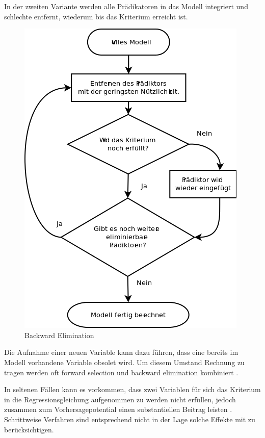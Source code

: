 \documentclass[english,12pt,doc]{apa}
\begin{document}
In der zweiten Variante werden alle Prädikatoren in das Modell integriert und schlechte entfernt, wiederum bis das Kriterium erreicht ist. 
\begin{figure}[hb]
	\centering
	\includegraphics[width=\textwidth]{backward_stepwise.png}
	\caption{Backward Elimination}
	\label{fig:backward_stepwise}
\end{figure}

Die Aufnahme einer neuen Variable kann dazu führen, dass eine bereits im Modell vorhandene Variable obsolet wird. 
Um diesem Umstand Rechnung zu tragen werden oft forward selection und backward elimination kombiniert \cite[p. 461]{bortz2011}. 

In seltenen Fällen kann es vorkommen, dass zwei Variablen für sich das Kriterium in die Regressionsgleichung aufgenommen zu werden nicht erfüllen, jedoch zusammen zum Vorhersagepotential einen substantiellen Beitrag leisten \cite[p.261]{jacob2003applied}. 
Schrittweise Verfahren sind entsprechend nicht in der Lage solche Effekte mit zu berücksichtigen. 
\end{document}
